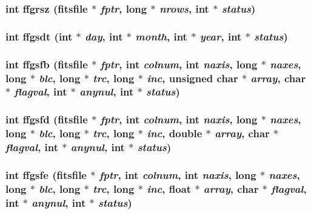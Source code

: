 \subsubsection{\setlength{\rightskip}{0pt plus 5cm}int ffgrsz (\bf{fitsfile} $\ast$ {\em fptr}, long $\ast$ {\em nrows}, int $\ast$ {\em status})}\label{fitsio_8h_e7f21a30d99f8d7fd38c49d05f0acc62}


\subsubsection{\setlength{\rightskip}{0pt plus 5cm}int ffgsdt (int $\ast$ {\em day}, int $\ast$ {\em month}, int $\ast$ {\em year}, int $\ast$ {\em status})}\label{fitsio_8h_e7df3dbfb42a9a6a6a54e6ed084f5f03}


\subsubsection{\setlength{\rightskip}{0pt plus 5cm}int ffgsfb (\bf{fitsfile} $\ast$ {\em fptr}, int {\em colnum}, int {\em naxis}, long $\ast$ {\em naxes}, long $\ast$ {\em blc}, long $\ast$ {\em trc}, long $\ast$ {\em inc}, unsigned char $\ast$ {\em array}, char $\ast$ {\em flagval}, int $\ast$ {\em anynul}, int $\ast$ {\em status})}\label{fitsio_8h_eec81cbe16bbd72a2ccc01e2b39ccc19}


\subsubsection{\setlength{\rightskip}{0pt plus 5cm}int ffgsfd (\bf{fitsfile} $\ast$ {\em fptr}, int {\em colnum}, int {\em naxis}, long $\ast$ {\em naxes}, long $\ast$ {\em blc}, long $\ast$ {\em trc}, long $\ast$ {\em inc}, double $\ast$ {\em array}, char $\ast$ {\em flagval}, int $\ast$ {\em anynul}, int $\ast$ {\em status})}\label{fitsio_8h_beeb182f75ceb2f94e28d9653b7fd612}


\subsubsection{\setlength{\rightskip}{0pt plus 5cm}int ffgsfe (\bf{fitsfile} $\ast$ {\em fptr}, int {\em colnum}, int {\em naxis}, long $\ast$ {\em naxes}, long $\ast$ {\em blc}, long $\ast$ {\em trc}, long $\ast$ {\em inc}, float $\ast$ {\em array}, char $\ast$ {\em flagval}, int $\ast$ {\em anynul}, int $\ast$ {\em status})}\label{fitsio_8h_a8b0872e27d9bd6b655586b7cbb4ab2a}


